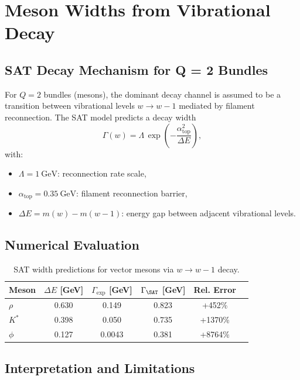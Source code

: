 

\section{Meson Widths from Vibrational Decay}
\label{sec:meson_widths}

\subsection{SAT Decay Mechanism for Q = 2 Bundles}

For $Q=2$ bundles (mesons), the dominant decay channel is assumed to be
a transition between vibrational levels $w \to w{-}1$ mediated by filament
reconnection. The SAT model predicts a decay width
\[
\Gamma(w) = \Lambda \, \exp\left( -\frac{\alpha_{\text{top}}^2}{\Delta E} \right),
\]
with:
\begin{itemize}
  \item $\Lambda = 1~\text{GeV}$: reconnection rate scale,
  \item $\alpha_{\text{top}} = 0.35~\text{GeV}$: filament reconnection barrier,
  \item $\Delta E = m(w) - m(w{-}1)$: energy gap between adjacent vibrational levels.
\end{itemize}

\subsection{Numerical Evaluation}

\begin{table}[ht]
\centering
\caption{SAT width predictions for vector mesons via $w \to w{-}1$ decay.}
\label{tab:meson_widths}
\begin{tabular}{lccccl}
\toprule
Meson & $\Delta E$ [GeV] & $\Gamma_{\exp}$ [GeV] & $\Gamma_{\SAT}$ [GeV] & Rel. Error \\
\midrule
$\rho$ & 0.630 & 0.149  & 0.823  & +452\% \\
$K^*$  & 0.398 & 0.050  & 0.735  & +1370\% \\
$\phi$ & 0.127 & 0.0043 & 0.381  & +8764\% \\
\bottomrule
\end{tabular}
\end{table}

\subsection{Interpretation and Limitations}

